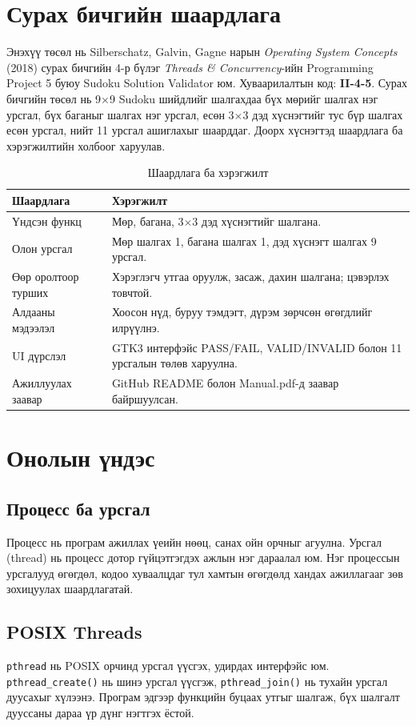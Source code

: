 \documentclass[12pt,a4paper]{report}
\begin{document}
\chapter{Сурах бичгийн шаардлага}
Энэхүү төсөл нь Silberschatz, Galvin, Gagne нарын \textit{Operating System Concepts} (2018) сурах бичгийн 4-р бүлэг \textit{Threads \& Concurrency}-ийн Programming Project 5 буюу Sudoku Solution Validator юм. Хуваарилалтын код: \textbf{II-4-5}. Сурах бичгийн төсөл нь 9$\times$9 Sudoku шийдлийг шалгахдаа бүх мөрийг шалгах нэг урсгал, бүх баганыг шалгах нэг урсгал, есөн 3$\times$3 дэд хүснэгтийг тус бүр шалгах есөн урсгал, нийт 11 урсгал ашиглахыг шаарддаг. Доорх хүснэгтэд шаардлага ба хэрэгжилтийн холбоог харуулав.
\begin{table}[H]\centering\caption{Шаардлага ба хэрэгжилт}\begin{tabular}{P{0.4\textwidth}P{0.5\textwidth}}\toprule
\textbf{Шаардлага}&\textbf{Хэрэгжилт}\\\midrule
Үндсэн функц&Мөр, багана, 3$\times$3 дэд хүснэгтийг шалгана.\\
Олон урсгал&Мөр шалгах 1, багана шалгах 1, дэд хүснэгт шалгах 9 урсгал.\\
Өөр оролтоор турших&Хэрэглэгч утгаа оруулж, засаж, дахин шалгана; цэвэрлэх товчтой.\\
Алдааны мэдээлэл&Хоосон нүд, буруу тэмдэгт, дүрэм зөрчсөн өгөгдлийг илрүүлнэ.\\
UI дүрслэл&GTK3 интерфэйс PASS/FAIL, VALID/INVALID болон 11 урсгалын төлөв харуулна.\\
Ажиллуулах заавар&GitHub README болон Manual.pdf-д заавар байршуулсан.\\\bottomrule\end{tabular}\end{table}

\chapter{Онолын үндэс}
\section{Процесс ба урсгал}
Процесс нь програм ажиллах үеийн нөөц, санах ойн орчныг агуулна. Урсгал (thread) нь процесс дотор гүйцэтгэгдэх ажлын нэг дараалал юм. Нэг процессын урсгалууд өгөгдөл, кодоо хуваалцдаг тул хамтын өгөгдөлд хандах ажиллагааг зөв зохицуулах шаардлагатай.
\section{POSIX Threads}
\texttt{pthread} нь POSIX орчинд урсгал үүсгэх, удирдах интерфэйс юм. \texttt{pthread\_create()} нь шинэ урсгал үүсгэж, \texttt{pthread\_join()} нь тухайн урсгал дуусахыг хүлээнэ. Програм эдгээр функцийн буцаах утгыг шалгаж, бүх шалгалт дууссаны дараа үр дүнг нэгтгэх ёстой.
\end{document}
